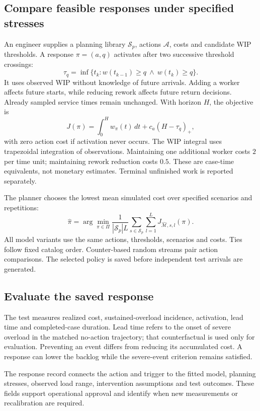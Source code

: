 \subsection{Compare feasible responses under specified stresses}
An engineer supplies a planning library $\mathcal S_p$, actions $\mathcal A$, costs and candidate WIP thresholds. A response $\pi=(a,q)$ activates after two successive threshold crossings:
\begin{equation}\label{eq:trigger}
\tau_q=\inf\{t_k:w(t_{k-1})\geq q\ \land\ w(t_k)\geq q\}.
\end{equation}
It uses observed WIP without knowledge of future arrivals. Adding a worker affects future starts, while reducing rework affects future return decisions. Already sampled service times remain unchanged. With horizon $H$, the objective is
\begin{equation}\label{eq:cost}
J(\pi)=\int_0^H w_\pi(t)\,dt+c_a(H-\tau_q)_+,
\end{equation}
with zero action cost if activation never occurs. The WIP integral uses trapezoidal integration of observations. Maintaining one additional worker costs $2$ per time unit; maintaining rework reduction costs $0.5$. These are case-time equivalents, not monetary estimates. Terminal unfinished work is reported separately.

The planner chooses the lowest mean simulated cost over specified scenarios and repetitions:
\begin{equation}\label{eq:policy}
\widehat\pi=\arg\min_{\pi\in\Pi}\frac{1}{|\mathcal S_p|L}
\sum_{s\in\mathcal S_p}\sum_{l=1}^{L}J_{\widehat{\mathcal M},s,l}(\pi).
\end{equation}
All model variants use the same actions, thresholds, scenarios and costs. Ties follow fixed catalog order. Counter-based random streams pair action comparisons. The selected policy is saved before independent test arrivals are generated.

\subsection{Evaluate the saved response}
The test measures realized cost, sustained-overload incidence, activation, lead time and completed-case duration. Lead time refers to the onset of severe overload in the matched no-action trajectory; that counterfactual is used only for evaluation. Preventing an event differs from reducing its accumulated cost. A response can lower the backlog while the severe-event criterion remains satisfied.

The response record connects the action and trigger to the fitted model, planning stresses, observed load range, intervention assumptions and test outcomes. These fields support operational approval and identify when new measurements or recalibration are required.
